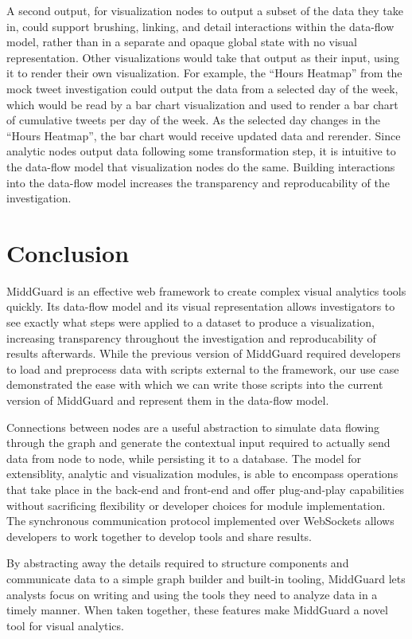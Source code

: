 \documentclass[midd]{thesis}
\begin{document}
A second output, for visualization nodes to output a subset of the data they
take in, could support brushing, linking, and detail interactions within the
data-flow model, rather than in a separate and opaque global state with no
visual representation. Other visualizations would take that output as their
input, using it to render their own visualization. For example, the ``Hours
Heatmap'' from the mock tweet investigation could output the data from a
selected  day of the week, which would be read by a bar chart visualization and
used to render a bar chart of cumulative tweets per day of the week. As the
selected day changes in the ``Hours Heatmap'', the bar chart would receive
updated data and rerender. Since analytic nodes output data following some
transformation step, it is intuitive to the data-flow model that visualization
nodes do the same. Building interactions into the data-flow model increases the
transparency and reproducability of the investigation.

\chapter{Conclusion}

MiddGuard is an effective web framework to create complex visual analytics tools
quickly. Its data-flow model and its visual representation allows investigators
to see exactly what steps were applied to a dataset to produce a visualization,
increasing transparency throughout the investigation and reproducability of
results afterwards. While the previous version of MiddGuard required developers
to load and preprocess data with scripts external to the framework, our use case
demonstrated the ease with which we can write those scripts into the current
version of MiddGuard and represent them in the data-flow model.

Connections between nodes are a useful abstraction to simulate data flowing
through the graph and generate the contextual input required to actually send
data from node to node, while persisting it to a database. The model for
extensiblity, analytic and visualization modules, is able to encompass
operations that take place in the back-end and front-end and offer plug-and-play
capabilities without sacrificing flexibility or developer choices for module
implementation. The synchronous communication protocol implemented over
WebSockets allows developers to work together to develop tools and share
results.

By abstracting away the details required to structure components and communicate
data to a simple graph builder and built-in tooling, MiddGuard lets analysts
focus on writing and using the tools they need to analyze data in a timely
manner. When taken together, these features make MiddGuard a novel tool for
visual analytics.
\end{document}

